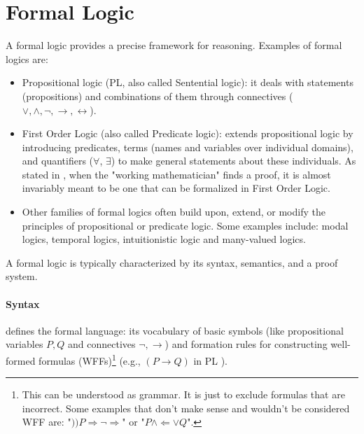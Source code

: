 \section{Formal Logic}

A formal logic provides a precise framework for reasoning. Examples of formal logics are:

\begin{itemize}
    \item Propositional logic (PL, also called Sentential logic)\cite[Ch.~6]{ConciseLogicBook}: it deals with statements (propositions) and combinations of them through connectives ($ \lor, \land, \neg, \rightarrow, \leftrightarrow$).
    \item First Order Logic (also called Predicate logic)\cite[Ch.~8]{ConciseLogicBook}: extends propositional logic by introducing predicates, terms (names and variables over individual domains), and quantifiers ($\forall$, $\exists$) to make general statements about these individuals. As stated in \cite[p.~67]{MathLogicBook}, when the "working mathematician" finds a proof, it is almost invariably meant to be one that can be formalized in First Order Logic.
    \item Other families of formal logics often build upon, extend, or modify the principles of propositional or predicate logic. Some examples include: modal logics, temporal logics, intuitionistic logic and many-valued logics.
\end{itemize}

A formal logic is typically characterized by its syntax, semantics, and a proof system.

\paragraph{Syntax} defines the formal language: its vocabulary of basic symbols (like propositional variables $P, Q$ and connectives $\neg, \rightarrow$) and formation rules for constructing well-formed formulas (WFFs)\footnote{This can be understood as grammar. It is just to exclude formulas that are incorrect. Some examples that don't make sense and wouldn't be considered WFF are: "$))P\Rightarrow \neg\Rightarrow $" or "$P \land \Leftarrow \lor Q$".\cite[Sec.~2.3.3]{Agler2013SymbolicLogic}} (e.g., $(P \rightarrow Q)$ in PL \cite[Sec.~2.3.3]{Agler2013SymbolicLogic}).


